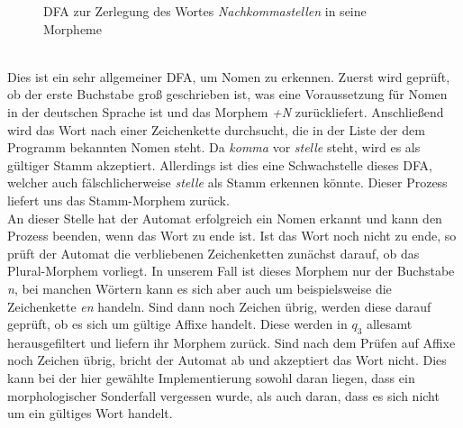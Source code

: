 \documentclass[12pt,twoside]{article}
\theoremstyle{plain}
\theoremstyle{definition}
\theoremstyle{remark}
\begin{document}
\begin{figure}[h]
\caption{DFA zur Zerlegung des Wortes \textit{Nachkommastellen} in seine Morpheme}
\label{dfa1}
\end{figure}\\
Dies ist ein sehr allgemeiner DFA, um Nomen zu erkennen.
Zuerst wird geprüft, ob der erste Buchstabe groß geschrieben ist, was eine Voraussetzung für Nomen in der deutschen Sprache ist und das Morphem \textit{+N} zurückliefert.
Anschließend wird das Wort nach einer Zeichenkette durchsucht, die in der Liste der dem Programm bekannten Nomen steht.
Da \textit{komma} vor \textit{stelle} steht, wird es als gültiger Stamm akzeptiert.
Allerdings ist dies eine Schwachstelle dieses DFA, welcher auch fälschlicherweise \textit{stelle} als Stamm erkennen könnte. Dieser Prozess liefert uns das Stamm-Morphem zurück.\\
An dieser Stelle hat der Automat erfolgreich ein Nomen erkannt und kann den Prozess beenden, wenn das Wort zu ende ist.
Ist das Wort noch nicht zu ende, so prüft der Automat die verbliebenen Zeichenketten zunächst darauf, ob das Plural-Morphem vorliegt. 
In unserem Fall ist dieses Morphem nur der Buchstabe \textit{n}, bei manchen Wörtern kann es sich aber auch um beispielsweise die Zeichenkette \textit{en} handeln.
Sind dann noch Zeichen übrig, werden diese darauf geprüft, ob es sich um gültige Affixe handelt. Diese werden in $q_3$ allesamt herausgefiltert und liefern ihr Morphem zurück.
Sind nach dem Prüfen auf Affixe noch Zeichen übrig, bricht der Automat ab und akzeptiert das Wort nicht.
Dies kann bei der hier gewählte Implementierung sowohl daran liegen, dass ein morphologischer Sonderfall vergessen wurde, als auch daran, dass es sich nicht um ein gültiges Wort handelt.
\end{document}
